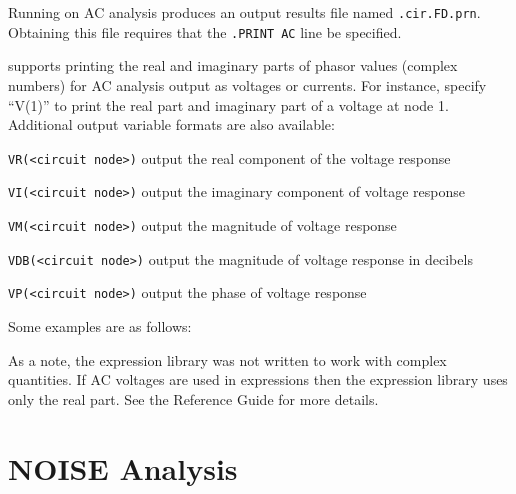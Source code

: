 \label{AC_print}

Running \Xyce{} on AC analysis produces an output results file named
\verb|.cir.FD.prn|. Obtaining this file requires that the \verb|.PRINT AC| line
be specified.

\Xyce{}  supports printing the real and imaginary parts of phasor values
(complex numbers) for AC analysis output as voltages or currents. For instance,
specify ``V(1)'' to print the real part and imaginary part of a voltage at
node 1. Additional output variable formats are also available:
\begin{XyceItemize}
\item \texttt{VR(<circuit node>)} output the real component of the voltage response
\item \texttt{VI(<circuit node>)} output the imaginary component of voltage response
\item \texttt{VM(<circuit node>)} output the magnitude of voltage response
\item \texttt{VDB(<circuit node>)} output the magnitude of voltage response in decibels
\item \texttt{VP(<circuit node>)} output the phase of voltage response
\end{XyceItemize}

Some examples are as follows: 

As a note, the \Xyce{} expression library was not written to work with complex 
quantities. If AC voltages are used in expressions then the expression library 
uses only the real part.  See the \Xyce{} Reference Guide\ReferenceGuide{}
for more details.


\section{NOISE Analysis}
\label{NOISE_Analysis}
\label{NOISE_Sweep_Overview}
 
 

